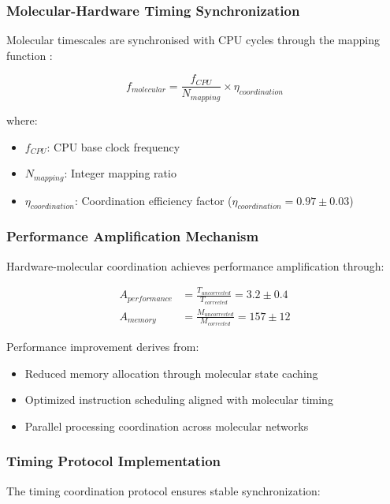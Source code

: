 \documentclass[12pt,a4paper]{article}
\begin{document}
\subsubsection{Molecular-Hardware Timing Synchronization}

Molecular timescales are synchronised with CPU cycles through the mapping function \cite{hennessy2019computer}:

\begin{equation}
f_{molecular} = \frac{f_{CPU}}{N_{mapping}} \times \eta_{coordination}
\end{equation}

where:
\begin{itemize}
\item $f_{CPU}$: CPU base clock frequency
\item $N_{mapping}$: Integer mapping ratio
\item $\eta_{coordination}$: Coordination efficiency factor ($\eta_{coordination} = 0.97 \pm 0.03$)
\end{itemize}

\subsubsection{Performance Amplification Mechanism}

Hardware-molecular coordination achieves performance amplification through:

\begin{align}
A_{performance} &= \frac{T_{uncorrected}}{T_{corrected}} = 3.2 \pm 0.4 \\
A_{memory} &= \frac{M_{uncorrected}}{M_{corrected}} = 157 \pm 12
\end{align}

Performance improvement derives from:
\begin{itemize}
\item Reduced memory allocation through molecular state caching
\item Optimized instruction scheduling aligned with molecular timing
\item Parallel processing coordination across molecular networks
\end{itemize}

\subsubsection{Timing Protocol Implementation}

The timing coordination protocol ensures stable synchronization:
\end{document}
